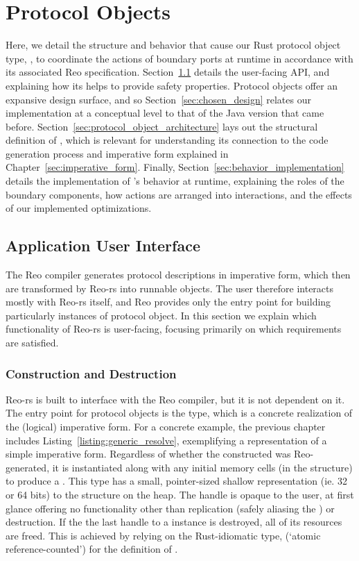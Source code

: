 \section{Protocol Objects}
\label{sec:protocol_objects}
Here, we detail the structure and behavior that cause our Rust protocol object type, , to coordinate the actions of boundary ports at runtime in accordance with its associated Reo specification. Section~\ref{sec:user_facing} details the user-facing API, and explaining how its helps to provide safety properties. Protocol objects offer an expansive design surface, and so Section~\ref{sec:chosen_design} relates our implementation at a conceptual level to that of the Java version that came before. Section~\ref{sec:protocol_object_architecture} lays out the structural definition of , which is relevant for understanding its connection to the code generation process and imperative form explained in Chapter~\ref{sec:imperative_form}. Finally, Section~\ref{sec:behavior_implementation} details the implementation of 's behavior at runtime, explaining the roles of the boundary components, how actions are arranged into interactions, and the effects of our implemented optimizations.

\subsection{Application User Interface}
\label{sec:user_facing}
The Reo compiler generates protocol descriptions in imperative form, which then are transformed by Reo-rs into runnable objects. The user therefore interacts mostly with Reo-rs itself, and Reo provides only the entry point for building particularly instances of protocol object. In this section we explain which functionality of Reo-rs is user-facing, focusing primarily on which requirements are satisfied.


\subsubsection{Construction and Destruction}
\label{sec:construction_and_destruction}
Reo-rs is built to interface with the Reo compiler, but it is not dependent on it. The entry point for protocol objects is the  type, which is a concrete realization of the (logical) imperative form. For a concrete example, the previous chapter includes Listing~\ref{listing:generic_resolve}, exemplifying a  representation of a simple imperative form. Regardless of whether the constructed  was Reo-generated, it is instantiated along with any initial memory cells (in the  structure) to produce a . This type has a small, pointer-sized shallow representation (ie. 32 or 64 bits) to the  structure on the heap. The handle is opaque to the user, at first glance offering no functionality other than replication (safely aliasing the ) or destruction. If the the last handle to a  instance is destroyed, all of its resources are freed. This is achieved by relying on the Rust-idiomatic  type, (`atomic reference-counted') for the definition of .

